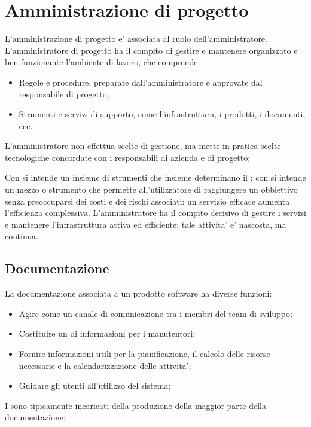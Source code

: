 \section{Amministrazione di progetto}
L'amministrazione di progetto e' associata al ruolo dell'amministratore. L'amministratore di progetto ha il compito di gestire e mantenere organizzato e ben funzionante l'ambiente di lavoro, che comprende:

\begin{itemize}
	\item Regole e procedure, preparate dall'amministratore e approvate dal responsabile di progetto;
	\item Strumenti e servizi di supporto, come l'infrastruttura, i prodotti, i documenti, ecc. 
\end{itemize}

L'amministratore non effettua scelte di gestione, ma mette in pratica scelte tecnologiche concordate con i responsabili di azienda e di progetto;

Con  si intende un insieme di strumenti che insieme determinano il ; con  si intende un mezzo o strumento che permette all'utilizzatore di raggiungere un obbiettivo senza preoccuparsi dei costi e dei rischi associati: un servizio efficace aumenta l'efficienza complessiva. L'amministratore ha il compito decisivo di gestire i servizi e mantenere l'infrastruttura attiva ed efficiente; tale attivita' e' nascosta, ma continua.

\subsection{Documentazione}
La documentazione associata a un prodotto software ha diverse funzioni:
\begin{itemize}
	\item Agire come un canale di comunicazione tra i membri del team di sviluppo;
	\item Costituire un  di informazioni per i manutentori;
	\item Fornire informazioni utili per la pianificazione, il calcolo delle risorse necessarie e la calendarizzazione delle attivita';
	\item Guidare gli utenti all'utilizzo del sistema;
\end{itemize}

I  sono tipicamente incaricati della produzione della maggior parte della documentazione;

